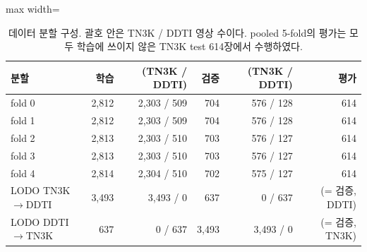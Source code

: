 \begin{table}[htbp]
\centering
\small
\caption[데이터 분할 구성.]{데이터 분할 구성. 괄호 안은 TN3K / DDTI 영상 수이다. pooled 5-fold의 평가는 모두 학습에 쓰이지 않은 TN3K test 614장에서 수행하였다.}
\label{tab:splits}
\begin{adjustbox}{max width=\linewidth}
\begin{tabular}{lrrrrr}
\toprule
분할 & 학습 & (TN3K / DDTI) & 검증 & (TN3K / DDTI) & 평가 \\
\midrule
fold 0 & 2,812 & 2,303 / 509 & 704 & 576 / 128 & 614 \\
fold 1 & 2,812 & 2,303 / 509 & 704 & 576 / 128 & 614 \\
fold 2 & 2,813 & 2,303 / 510 & 703 & 576 / 127 & 614 \\
fold 3 & 2,813 & 2,303 / 510 & 703 & 576 / 127 & 614 \\
fold 4 & 2,814 & 2,304 / 510 & 702 & 575 / 127 & 614 \\
\midrule
LODO TN3K$\rightarrow$DDTI & 3,493 & 3,493 / 0 & 637 & 0 / 637 & (= 검증, DDTI) \\
LODO DDTI$\rightarrow$TN3K & 637 & 0 / 637 & 3,493 & 3,493 / 0 & (= 검증, TN3K) \\
\bottomrule
\end{tabular}
\end{adjustbox}
\end{table}
